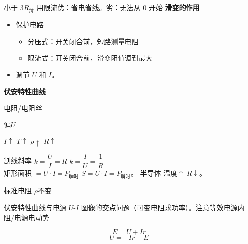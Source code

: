 小于 $3R_{\text{滑}}$ 用限流\quad 优：省电省线。\quad 劣：无法从 $0$ 开始
\textbf{滑变的作用}
\begin{itemize}
\item 保护电路
  \begin{itemize}
  \item 分压式：开关闭合前，短路测量电阻
  \item 限流式：开关闭合前，滑变阻值调到最大
  \end{itemize}
\item 调节 $U$ 和 $I$。
\end{itemize}
\textbf{伏安特性曲线}



电阻/电阻丝

偏$U$

$I\uparrow$  $T\uparrow$ $\rho\uparrow$ $R\uparrow$

\noindent 割线斜率 $k=\dfrac{U}{I}=R$ \qquad\qquad $k=\dfrac{I}{U}=\dfrac{1}{R}$\\[4pt]
矩形面积 $=U\cdot I=P_{\text{瞬时}}$ \qquad\quad $S=U\cdot I=P_{\text{瞬时}}$。
半导体 \quad 温度$\uparrow$ $R\downarrow$。

标准电阻 \quad $\rho$不变


伏安特性曲线与电源 $U$-$I$ 图像的交点问题（可变电阻求功率）。\quad 注意等效电源内阻/电源电动势


\[ E=U+Ir \]
\[ U=-Ir+E \]

